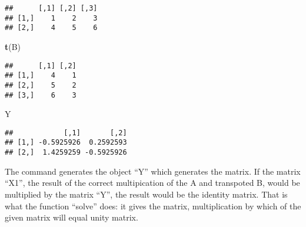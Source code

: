 \documentclass[12pt,]{article}
\newenvironment{Shaded}{\begin{snugshade}}{\end{snugshade}}
\newcommand{\KeywordTok}[1]{\textcolor[rgb]{0.13,0.29,0.53}{\textbf{#1}}}
\newcommand{\OperatorTok}[1]{\textcolor[rgb]{0.81,0.36,0.00}{\textbf{#1}}}
\newcommand{\NormalTok}[1]{#1}
\begin{document}
\begin{Shaded}
\end{Shaded}

\begin{verbatim}
##      [,1] [,2] [,3]
## [1,]    1    2    3
## [2,]    4    5    6
\end{verbatim}

\begin{Shaded}
\begin{Highlighting}[]
\KeywordTok{t}\NormalTok{(B)}
\end{Highlighting}
\end{Shaded}

\begin{verbatim}
##      [,1] [,2]
## [1,]    4    1
## [2,]    5    2
## [3,]    6    3
\end{verbatim}

\begin{Shaded}
\begin{Highlighting}[]
\NormalTok{Y}
\end{Highlighting}
\end{Shaded}

\begin{verbatim}
##            [,1]       [,2]
## [1,] -0.5925926  0.2592593
## [2,]  1.4259259 -0.5925926
\end{verbatim}

The command generates the object ``Y'' which generates the matrix. If
the matrix ``X1'', the result of the correct multipication of the A and
transpoted B, would be multiplied by the matrix ``Y'', the result would
be the identity matrix. That is what the function ``solve'' does: it
gives the matrix, multiplication by which of the given matrix will equal
unity matrix.
\end{document}
